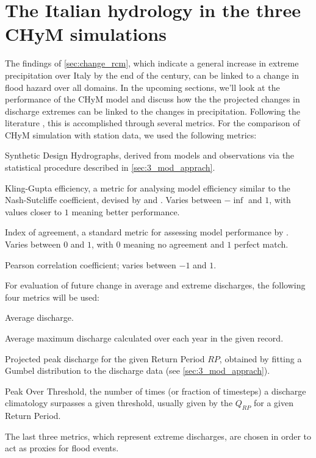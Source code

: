 \section{The Italian hydrology in the three CHyM simulations} \label{sec:results_chym}
The findings of \cref{sec:change_rcm}, which indicate a general increase in extreme precipitation over Italy by the end of the century, can be linked to a change in flood hazard over all domains.
In the upcoming sections, we'll look at the performance of the CHyM model and discuss how the the projected changes in discharge extremes can be linked to the changes in precipitation. Following the literature \citep[e.g.][]{Alfieri2015a}, this is accomplished through several metrics.
For the comparison of CHyM simulation with station data, we used the following metrics:
\begin{description}[labelwidth=0pt, leftmargin=!, align=right]
    \item[SDH] Synthetic Design Hydrographs, derived from models and observations via the statistical procedure described in \cref{sec:3_mod_apprach}.
    \item[KGE] Kling-Gupta efficiency, a metric for analysing model efficiency similar to the Nash-Sutcliffe coefficient, devised by \citet{Gupta2009} and \citet{Kling2012}. Varies between $-\inf$ and $1$, with values closer to $1$ meaning better performance.
    \item[d] Index of agreement, a standard metric for assessing model performance by \citet{Willmott1984}. Varies between $0$ and $1$, with $0$ meaning no agreement and $1$ perfect match.
    \item[r] Pearson correlation coefficient; varies between $-1$ and $1$.
\end{description}
For evaluation of future change in average and extreme discharges, the following four metrics will be used:
\begin{description}[labelwidth=0pt, leftmargin=!, align=right]
    \item[$\boldsymbol{\overline{Q}}$] Average discharge.
    \item[$\boldsymbol{Q_{ymax}}$] Average maximum discharge calculated over each year in the given record.
    \item[$\boldsymbol{Q_{RP}}$] Projected peak discharge for the given Return Period $RP$, obtained by fitting a Gumbel distribution to the discharge data (see \cref{sec:3_mod_apprach}).
    \item[POT] Peak Over Threshold, the number of times (or fraction of timesteps) a discharge climatology surpasses a given threshold, usually given by the $Q_{RP}$ for a given Return Period.
\end{description}
The last three metrics, which represent extreme discharges, are chosen in order to act as proxies for flood events.

